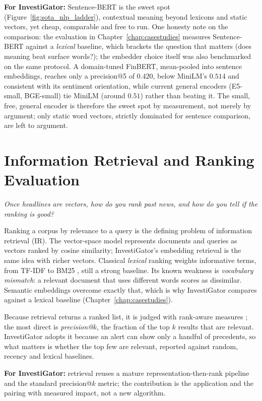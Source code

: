 \textbf{For InvestiGator:} Sentence-BERT is the sweet spot (Figure~\ref{fig:sota_nlp_ladder}),
contextual meaning beyond lexicons and static vectors, yet cheap, comparable and free to run. One honesty note on the comparison: the evaluation in
Chapter~\ref{chap:casestudies} measures Sentence-BERT against a \emph{lexical} baseline, which brackets
the question that matters (does meaning beat surface words?); the embedder choice itself was also
benchmarked on the same protocol. A domain-tuned FinBERT, mean-pooled into sentence embeddings, reaches
only a precision@5 of $0.420$, below MiniLM's $0.514$ and consistent with its sentiment orientation,
while current general encoders (E5-small, BGE-small) tie MiniLM (around $0.51$) rather than beating it.
The small, free, general encoder is therefore the sweet spot by measurement, not merely by argument;
only static word vectors, strictly dominated for sentence comparison, are left to argument.

\section{Information Retrieval and Ranking Evaluation}
\label{sec:sota_ir}

\emph{Once headlines are vectors, how do you rank past news, and how do you tell if the ranking is good?}

Ranking a corpus by relevance to a query is the defining problem of information retrieval (IR). The
vector-space model \autocite{salton1975vsm} represents documents and queries as vectors ranked by cosine
similarity; InvestiGator's embedding retrieval is the same idea with richer vectors. Classical \emph{lexical}
ranking weights informative terms, from TF-IDF to BM25 \autocite{robertson2009bm25}, still a strong
baseline. Its known weakness is \emph{vocabulary mismatch}: a relevant document that uses different words
scores as dissimilar. Semantic embeddings overcome exactly that, which is why InvestiGator compares against a
lexical baseline (Chapter~\ref{chap:casestudies}).

Because retrieval returns a ranked list, it is judged with rank-aware measures \autocite{manning2008ir}; the
most direct is \emph{precision@$k$}, the fraction of the top $k$ results that are relevant. InvestiGator adopts
it because an alert can show only a handful of precedents, so what matters is whether the top few are
relevant, reported against random, recency and lexical baselines.

\textbf{For InvestiGator:} retrieval reuses a mature representation-then-rank pipeline and the standard
precision@$k$ metric; the contribution is the application and the pairing with measured impact, not a new
algorithm.


